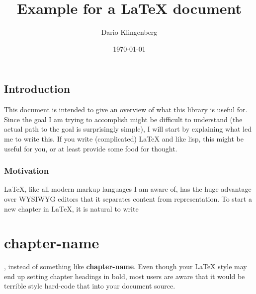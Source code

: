 \documentclass[11pt]{article}
\author{Dario Klingenberg}
\date{\today}
\title{Example for a \LaTeX{} document}
\begin{document}
\maketitle

\section{Introduction}
\label{sec:org99f5674}
  This document is intended to give an overview of what this library is useful for.
Since the goal I am trying to accomplish might be difficult to understand (the actual 
path to the goal is surprisingly simple),
I will start by explaining what led me to write this. 
If you write (complicated) \LaTeX{} and like lisp, this might be useful for you, or 
at least provide some food for thought.
\subsection{Motivation}
\label{sec:orgfa4a57e}
\LaTeX{}, like all modern markup languages I am aware of, has the huge advantage over
WYSIWYG editors that it separates content from representation. 
To start a new chapter in \LaTeX{}, it is natural to write \chapter{chapter-name},
instead of something like \textbf{chapter-name}. Even though your \LaTeX{} style 
may end up setting chapter headings in bold, most users are aware that
it would be terrible style hard-code that into your document source. 
\end{document}
